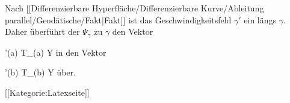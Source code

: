 Nach
[[Differenzierbare Hyperfläche/Differenzierbare Kurve/Ableitung parallel/Geodätische/Fakt|Fakt]]
ist das Geschwindigkeitsfeld $\gamma'$ ein
längs $\gamma$. Daher überführt der
$\Psi_\gamma$  zu $\gamma$ den Vektor

\mavergleichskette
{\vergleichskette
{ \gamma'(a)
}
{ \in }{  T_{\gamma(a)} Y
}
{  }{
}
{    }{
}
{   }{
}
}
{}{}{}
in den Vektor

\mavergleichskette
{\vergleichskette
{ \gamma'(b)
}
{ \in }{  T_{\gamma(b)} Y
}
{  }{
}
{    }{
}
{   }{
}
}
{}{}{}
über.

 [[Kategorie:Latexseite]]
